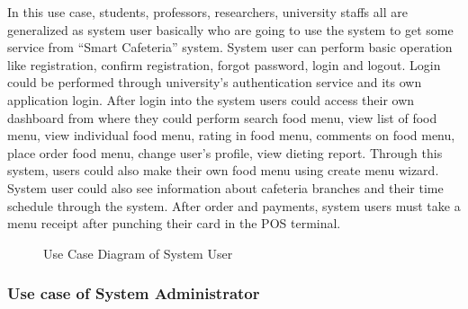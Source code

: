 In this use case, students, professors, researchers, university staffs all are
generalized as system user basically who are going to use the system to get some
service from ``Smart Cafeteria'' system.
System user can perform basic operation like registration, confirm registration,
forgot password, login and logout. Login could be performed through university's
authentication service and its own application login. After login into the
system users could access their own dashboard from where they could perform
search food menu, view list of food menu, view individual food menu, rating in
food menu, comments on food menu, place order food menu, change user's profile,
view dieting report. Through this system, users could also make their own food
menu using create menu wizard. System user could also see information about
cafeteria branches and their time schedule through the system. After order and
payments, system users must take a menu receipt after punching their card in the
POS terminal.

\begin{landscape}
\begin{figure}[h!t]
    \centering
  \caption{Use Case Diagram of System User}
  \label{UCSystemUser}
\end{figure}
\end{landscape}

\subsubsection{Use case of System Administrator}

